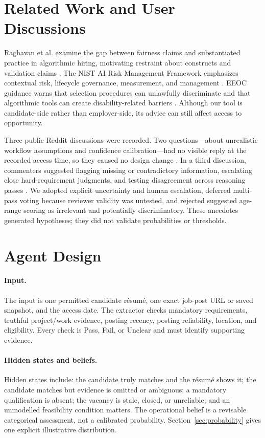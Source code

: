 \documentclass{article}
\begin{document}
\section{Related Work and User Discussions}
Raghavan et al. examine the gap between fairness claims and substantiated practice in algorithmic hiring, motivating restraint about constructs and validation claims \cite{raghavan2020}. The NIST AI Risk Management Framework emphasizes contextual risk, lifecycle governance, measurement, and management \cite{nist2023}. EEOC guidance warns that selection procedures can unlawfully discriminate and that algorithmic tools can create disability-related barriers \cite{eeoc_selection,eeoc_ada}. Although our tool is candidate-side rather than employer-side, its advice can still affect access to opportunity.

Three public Reddit discussions were recorded. Two questions---about unrealistic workflow assumptions and confidence calibration---had no visible reply at the recorded access time, so they caused no design change \cite{reddit_assumptions,reddit_calibration}. In a third discussion, commenters suggested flagging missing or contradictory information, escalating close hard-requirement judgments, and testing disagreement across reasoning passes \cite{reddit_agents}. We adopted explicit uncertainty and human escalation, deferred multi-pass voting because reviewer validity was untested, and rejected suggested age-range scoring as irrelevant and potentially discriminatory. These anecdotes generated hypotheses; they did not validate probabilities or thresholds.

\section{Agent Design}
\paragraph{Input.} The input is one permitted candidate r\'esum\'e, one exact job-post URL or saved snapshot, and the access date. The extractor checks mandatory requirements, truthful project/work evidence, posting recency, posting reliability, location, and eligibility. Every check is Pass, Fail, or Unclear and must identify supporting evidence.

\paragraph{Hidden states and beliefs.} Hidden states include: the candidate truly matches and the r\'esum\'e shows it; the candidate matches but evidence is omitted or ambiguous; a mandatory qualification is absent; the vacancy is stale, closed, or unreliable; and an unmodelled feasibility condition matters. The operational belief is a revisable categorical assessment, not a calibrated probability. Section~\ref{sec:probability} gives one explicit illustrative distribution.
\end{document}
